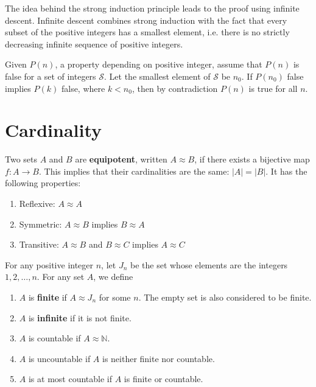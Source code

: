 \documentclass{article}
\begin{document}
  The idea behind the strong induction principle leads to the proof using infinite descent. Infinite descent combines strong induction with the fact that every subset of the positive integers has a smallest element, i.e. there is no strictly decreasing infinite sequence of positive integers. 

  \begin{lemma}
    Given $P(n)$, a property depending on positive integer, assume that $P(n)$ is false for a set of integers $\mathcal{S}$. Let the smallest element of $\mathcal{S}$ be $n_0$. If $P(n_0)$ false implies $P(k)$ false, where $k < n_0$, then by contradiction $P(n)$ is true for all $n$. 
  \end{lemma}

\section{Cardinality}

  \begin{definition}[Equipotence]
    Two sets $A$ and $B$ are \textbf{equipotent}, written $A \approx B$, if there exists a bijective map $f: A \rightarrow B$. This implies that their cardinalities are the same: $|A| = |B|$. It has the following properties: 
    \begin{enumerate}
      \item Reflexive: $A \approx A$
      \item Symmetric: $A \approx B$ implies $B \approx A$
      \item Transitive: $A \approx B$ and $B \approx C$ implies $A \approx C$
    \end{enumerate}
  \end{definition}

  \begin{definition}
    For any positive integer $n$, let $J_n$ be the set whose elements are the integers $1, 2, \ldots, n$. For any set $A$, we define 
    \begin{enumerate}
      \item $A$ is \textbf{finite} if $A \approx J_n$ for some $n$. The empty set is also considered to be finite. 
      \item $A$ is \textbf{infinite} if it is not finite. 
      \item $A$ is countable if $A \approx \mathbb{N}$. 
      \item $A$ is uncountable if $A$ is neither finite nor countable. 
      \item $A$ is at most countable if $A$ is finite or countable. 
    \end{enumerate}
  \end{definition}
\end{document}
